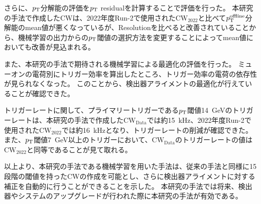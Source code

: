 さらに、$p_{\rm{T}}$分解能の評価を$p_{\rm{T}}$ residualを計算することで評価を行った。
本研究の手法で作成したCWは、2022年度Run-2で使用された$\mathrm{CW_{2022}}$と比べて$p_{\rm{T}}^{\rm{offline}}$分解能のmean値が悪くなっているが、Resolutionを比べると改善されていることから、機械学習の出力からの$p_{\rm{T}}$閾値の選択方法を変更することによってmean値においても改善が見込まれる。

また、本研究の手法で期待される機械学習による最適化の評価を行った。
ミューオンの電荷別にトリガー効率を算出したところ、トリガー効率の電荷の依存性が見られなくなった。
このことから、検出器アライメントの最適化が行えていることが確認できた。

トリガーレートに関して、プライマリートリガーである$p_{\rm{T}}$閾値14~GeVのトリガーレートは、本研究の手法で作成した$\mathrm{CW_{Data}}$では約15~kHz、2022年度Run-2で使用された$\mathrm{CW_{2022}}$では約16~kHzとなり、トリガーレートの削減が確認できた。また、$p_{\rm{T}}$閾値7~GeV以上のトリガーにおいて、$\mathrm{CW_{Data}}$のトリガーレートの値は$\mathrm{CW_{2022}}$と同等であることが見て取れる。

以上より、本研究の手法である機械学習を用いた手法は、従来の手法と同様に15段階の閾値を持ったCWの作成を可能とし、さらに検出器アライメントに対する補正を自動的に行うことができることを示した。
本研究の手法では将来、検出器やシステムのアップグレードが行われた際に本研究の手法が有効である。





